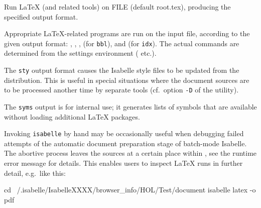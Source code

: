 \begin{isabellebody}
\begin{isamarkuptext}
\begin{ttbox}
  Run LaTeX (and related tools) on FILE (default root.tex),
  producing the specified output format.
\end{ttbox}

  Appropriate {\LaTeX}-related programs are run on the input file,
  according to the given output format: \hyperlink{executable.latex}{\mbox{}},
  \hyperlink{executable.pdflatex}{\mbox{}}, \hyperlink{executable.dvips}{\mbox{}}, \hyperlink{executable.bibtex}{\mbox{}}
  (for \verb|bbl|), and \hyperlink{executable.makeindex}{\mbox{}} (for \verb|idx|).  The actual commands are determined from the settings
  environment (\hyperlink{setting.ISABELLE-LATEX}{\mbox{}} etc.).

  The \verb|sty| output format causes the Isabelle style files to
  be updated from the distribution.  This is useful in special
  situations where the document sources are to be processed another
  time by separate tools (cf.\ option \verb|-D| of the \hyperlink{tool.usedir}{\mbox{}} utility).

  The \verb|syms| output is for internal use; it generates lists
  of symbols that are available without loading additional {\LaTeX}
  packages.%
\end{isamarkuptext}%
\isamarkuptrue%
%
\isamarkuptrue%
%
\begin{isamarkuptext}%
Invoking \verb|isabelle| \hyperlink{tool.latex}{\mbox{}} by hand may be
  occasionally useful when debugging failed attempts of the automatic
  document preparation stage of batch-mode Isabelle.  The abortive
  process leaves the sources at a certain place within \hyperlink{setting.ISABELLE-BROWSER-INFO}{\mbox{}}, see the runtime error message for details.
  This enables users to inspect {\LaTeX} runs in further detail, e.g.\
  like this:
\begin{ttbox}
  cd ~/.isabelle/IsabelleXXXX/browser_info/HOL/Test/document
  isabelle latex -o pdf
\end{ttbox}%
\end{isamarkuptext}%
\isamarkuptrue%
%
\isadelimtheory
%
\endisadelimtheory
%
\isatagtheory
{}\isamarkupfalse%
%
\endisatagtheory
{\isafoldtheory}%
%
\isadelimtheory
%
\endisadelimtheory
\end{isabellebody}%
